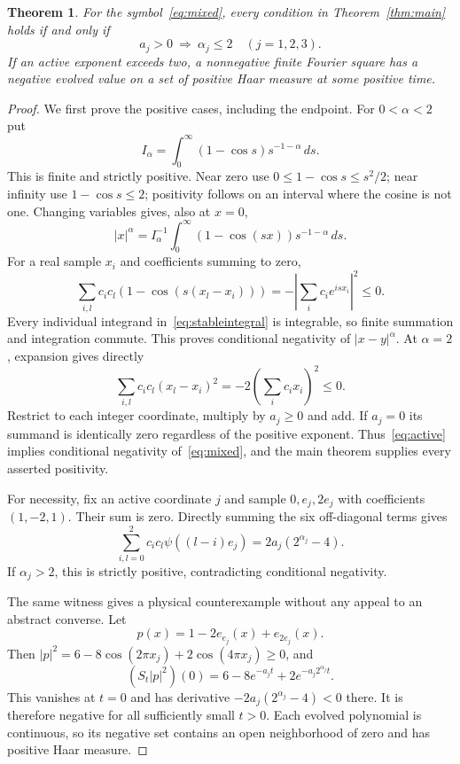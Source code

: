 \documentclass[11pt]{article}
\newtheorem{theorem}{Theorem}[section]
\theoremstyle{remark}\newtheorem{remark}[theorem]{Remark}
\begin{document}
\begin{theorem}\label{thm:threshold}
For the symbol~\eqref{eq:mixed}, every condition in
Theorem~\ref{thm:main} holds if and only if
\begin{equation}\label{eq:active}
 a_j>0\ \Longrightarrow\ \alpha_j\leq2
               \quad(j=1,2,3).
\end{equation}
If an active exponent exceeds two, a nonnegative finite Fourier
square has a negative evolved value on a set of positive Haar
measure at some positive time.
\end{theorem}
\begin{proof}
We first prove the positive cases, including the endpoint.
For $0<\alpha<2$ put
\[
 I_\alpha=\int_0^\infty(1-\cos s)s^{-1-\alpha}\,ds.
\]
This is finite and strictly positive. Near zero use
$0\leq1-\cos s\leq s^2/2$; near infinity use $1-\cos s\leq2$;
positivity follows on an interval where the cosine is not one.
Changing variables gives, also at $x=0$,
\begin{equation}\label{eq:stableintegral}
 |x|^\alpha=I_\alpha^{-1}\int_0^\infty
                  (1-\cos(sx))s^{-1-\alpha}\,ds.
\end{equation}
For a real sample $x_i$ and coefficients summing to zero,
\[
 \sum_{i,l}c_i c_l(1-\cos(s(x_l-x_i)))
              =-\left|\sum_i c_i e^{isx_i}\right|^2\leq0.
\]
Every individual integrand in~\eqref{eq:stableintegral} is
integrable, so finite summation and integration commute. This
proves conditional negativity of $|x-y|^\alpha$.
At $\alpha=2$, expansion gives directly
\[
 \sum_{i,l}c_i c_l(x_l-x_i)^2
                   =-2\left(\sum_i c_i x_i\right)^2\leq0.
\]
Restrict to each integer coordinate, multiply by $a_j\geq0$
and add. If $a_j=0$ its summand is identically zero regardless
of the positive exponent. Thus~\eqref{eq:active} implies
conditional negativity of~\eqref{eq:mixed}, and the main
theorem supplies every asserted positivity.

For necessity, fix an active coordinate $j$ and sample
$0,e_j,2e_j$ with coefficients $(1,-2,1)$. Their sum is zero.
Directly summing the six off-diagonal terms gives
\begin{equation}\label{eq:triple}
 \sum_{i,l=0}^2 c_i c_l\psi((l-i)e_j)
                         =2a_j(2^{\alpha_j}-4).
\end{equation}
If $\alpha_j>2$, this is strictly positive, contradicting
conditional negativity.

The same witness gives a physical counterexample without any
appeal to an abstract converse. Let
\[
 p(x)=1-2e_{e_j}(x)+e_{2e_j}(x).
\]
Then $|p|^2=6-8\cos(2\pi x_j)+2\cos(4\pi x_j)\geq0$, and
\begin{equation}\label{eq:squarewitness}
 (S_t|p|^2)(0)=6-8e^{-a_jt}+2e^{-a_j2^{\alpha_j}t}.
\end{equation}
This vanishes at $t=0$ and has derivative
$-2a_j(2^{\alpha_j}-4)<0$ there. It is therefore negative for
all sufficiently small $t>0$. Each evolved polynomial is
continuous, so its negative set contains an open neighborhood
of zero and has positive Haar measure.
\end{proof}
\end{document}
